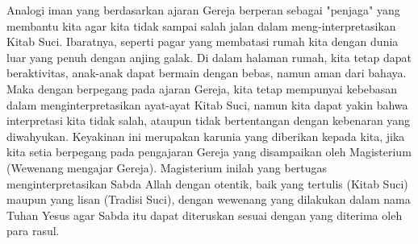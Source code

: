 \begin{enumerate}
Analogi iman yang berdasarkan ajaran Gereja berperan sebagai "penjaga" yang membantu kita agar kita tidak sampai salah jalan dalam meng-interpretasikan Kitab Suci. Ibaratnya, seperti pagar yang membatasi rumah kita dengan dunia luar yang penuh dengan anjing galak. Di dalam halaman rumah, kita tetap dapat beraktivitas, anak-anak dapat bermain dengan bebas, namun aman dari bahaya. Maka dengan berpegang pada ajaran Gereja, kita tetap mempunyai kebebasan dalam menginterpretasikan ayat-ayat Kitab Suci, namun kita dapat yakin bahwa interpretasi kita tidak salah, ataupun tidak bertentangan dengan kebenaran yang diwahyukan. Keyakinan ini merupakan karunia yang diberikan kepada kita, jika kita setia berpegang pada pengajaran Gereja yang disampaikan oleh Magisterium (Wewenang mengajar Gereja). Magisterium inilah yang bertugas menginterpretasikan Sabda Allah dengan otentik, baik yang tertulis (Kitab Suci) maupun yang lisan (Tradisi Suci), dengan wewenang yang dilakukan dalam nama Tuhan Yesus agar Sabda itu dapat diteruskan sesuai dengan yang diterima oleh para rasul.
\end{enumerate}

